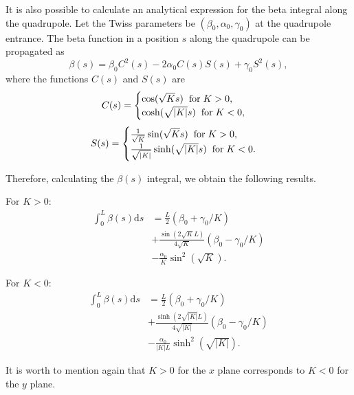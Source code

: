 It is also possible to calculate an analytical expression for the beta integral along the quadrupole. Let the Twiss parameters be $(\beta_0, \alpha_0, \gamma_0)$ at the quadrupole entrance. The beta function in a position $s$ along the quadrupole can be propagated as
\begin{equation}
\beta(s) = \beta_0 C^2(s) - 2\alpha_0 C(s)S(s) + \gamma_0S^2(s),
\end{equation}
where the functions $C(s)$ and $S(s)$ are
\[
C(s) = 
\begin{cases}
\cos(\sqrt{K}s) \hspace{0.2cm} \text{for} \hspace{0.1cm} K > 0, \\
\cosh(\sqrt{|K|}s) \hspace{0.2cm} \text{for} \hspace{0.1cm} K < 0, 
\end{cases}
\]
\[
S(s) = 
\begin{cases}
\frac{1}{\sqrt{K}}\sin(\sqrt{K}s) \hspace{0.2cm} \text{for} \hspace{0.1cm} K > 0, \\
\frac{1}{\sqrt{|K|}}\sinh(\sqrt{|K|}s) \hspace{0.2cm} \text{for} \hspace{0.1cm} K < 0.
\end{cases}
\]

Therefore, calculating the $\beta(s)$ integral, we obtain the following results.

For $K > 0$:
\begin{align*}
    \int_{0}^{L} \beta(s) \mathrm{d}s &= \frac{L}{2}\left(\beta_0 + \gamma_0/K\right) \\
    &+ \frac{\sin\left(2\sqrt{K}L\right)}{4 \sqrt{K}}\left(\beta_0 - \gamma_0/K\right) \\
    &- \frac{\alpha_0}{K}\sin^2\left(\sqrt{K}\right).
\end{align*}

For $K < 0$:
\begin{align*}
    \int_{0}^{L} \beta(s) \mathrm{d}s &= \frac{L}{2}\left(\beta_0 + \gamma_0/K\right)  \\ 
    &+ \frac{\sinh\left(2\sqrt{|K|}L\right)}{4 \sqrt{|K|}}\left(\beta_0 - \gamma_0/K\right) \\
    &- \frac{\alpha_0}{|K|L}\sinh^2\left(\sqrt{|K|}\right).
\end{align*}

It is worth to mention again that $K > 0$ for the $x$ plane corresponds to $K < 0$ for the $y$ plane. 

